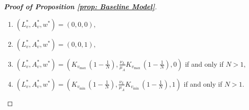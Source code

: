 \documentclass{article}
\theoremstyle{remark}
\theoremstyle{custom} %
\begin{document}
\begin{proof}[\textbf{Proof of Proposition \ref{prop: Baseline Model}}]
\begin{enumerate}
\item \underline{} $\left(L_v^*, A_v^*, w^*\right)=(0,0,0),$

 \item \underline{} $\left(L_v^*, A_v^*, w^*\right)=(0,0,1),$

 \item \underline{} $\left(L_v^*, A_v^*, w^*\right)=\left(K_{v_{\text {max }}}\left(1-\frac{1}{N}\right), \frac{\nu_L}{\mu_A} K_{v_{\text {max }}}\left(1-\frac{1}{N}\right), 0\right)$ if and only if $N>1,$

\item  \underline{} $\left(L_v^*, A_v^*, w^*\right)=\left(K_{v_{\text {min }}}\left(1-\frac{1}{N}\right), \frac{\nu_L}{\mu_A} K_{v_{\text {min }}}\left(1-\frac{1}{N}\right), 1\right)$ if and only if $N>1.$
\end{enumerate}

\end{proof}
\end{document}
